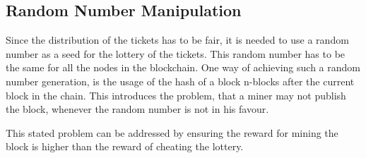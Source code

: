 \subsection{Random Number Manipulation}\label{subsection:random-number-manipulation}
Since the distribution of the tickets has to be fair, it is needed to use a random number as a seed for the lottery of the tickets. This random number has to be the same for all the nodes in the blockchain. One way of achieving such a random number generation, is the usage of the hash of a block n-blocks after the current block in the chain. This introduces the problem, that a miner may not publish the block, whenever the random number is not in his favour. 

This stated problem can be addressed by ensuring the reward for mining the block is higher than the reward of cheating the lottery. 

